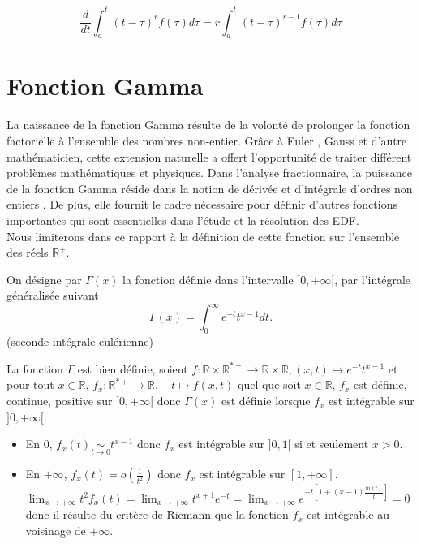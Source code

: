 \begin{equation} \label{Derive_I_para}
        \frac{d}{dt}\int_{a}^{t} (t-\tau)^r f(\tau) d\tau = r \int_{a}^{t} (t-\tau)^{r-1} f(\tau) d\tau
\end{equation}
\section{Fonction Gamma}
La naissance de la fonction Gamma résulte de la volonté de prolonger la fonction factorielle à l'ensemble des nombres non-entier. Grâce à Euler \cite{LEI}, Gauss et d'autre mathématicien, cette extension naturelle a offert l'opportunité de traiter différent problèmes mathématiques et physiques.
Dans l'analyse fractionnaire, la puissance de la fonction Gamma réside dans la notion de dérivée et d'intégrale d'ordres non entiers \cite{Frac_Cal_WolframeAlpha}.
De plus, elle fournit le cadre nécessaire pour définir d'autres fonctions importantes qui sont essentielles dans l'étude et la résolution des EDF.\\
Nous limiterons dans ce rapport à la définition de cette fonction sur l'ensemble des réels $\mathbb{R}^+$.
\begin{definition} On désigne par $\Gamma (x)$ la fonction définie dans l'intervalle $]0,+\infty[$, par l'intégrale généralisée suivant
    \begin{equation}
        \Gamma(x)=\int_{0}^{\infty} e^{-t} t^{x-1}dt.
    \end{equation}
    (seconde intégrale eulérienne)
\end{definition} 
La fonction $\Gamma$ est bien définie, soient
$f \colon \mathbb{R} \times \mathbb{R^{*+}} \to \mathbb{R}\times \mathbb{R}, (x,t)\mapsto e^{-t} t^{x-1}$ et pour tout $x \in \mathbb{R}$, $f_x \colon \mathbb{R^{*+}} \to \mathbb{R},
\quad t \mapsto f(x,t)$
quel que soit $x\in \mathbb{R}$, $f_x$ est définie, continue, positive sur $]0,+\infty[$ donc $\Gamma(x)$ est définie lorsque $f_x$ est intégrable sur $]0,+\infty[$.\\
\begin{itemize}
    \item En $0$, $f_x(t) \underset{t \to 0}{\sim}  t^{x-1}$ donc $f_x$ est intégrable sur $]0,1[$ si et seulement $x>0$.
    \item En $+\infty$, $f_x(t) = o(\frac{1}{t^2})$ donc $f_x$ est intégrable sur $[1, +\infty].$ $ \lim_{x\to +\infty}t^2 f_x(t) = \lim_{x\to +\infty} t^{x+1}e^{-t} = \lim_{x \to +\infty} e^{-t\left[1+(x-1)\frac{ln(t)}{t}\right]} = 0 $ donc il résulte du critère de Riemann que la fonction $f_x$ est intégrable au voisinage de $+\infty$.
\end{itemize}
